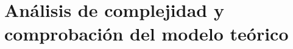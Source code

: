 %
%

\chapter{Análisis de complejidad y comprobación del modelo teórico}
\label{cap:análisis_comprobación}
